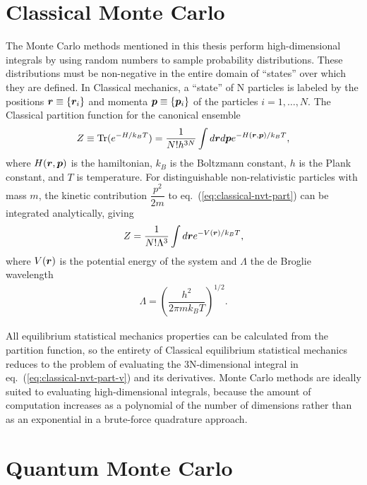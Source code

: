 \section{Classical Monte Carlo}
The Monte Carlo methods mentioned in this thesis perform high-dimensional integrals by using random numbers to sample probability distributions. These distributions must be non-negative in the entire domain of ``states'' over which they are defined. In Classical mechanics, a ``state'' of N particles is labeled by the positions $\boldsymbol{r}\equiv\{\boldsymbol{r}_i\}$ and momenta $\boldsymbol{p}\equiv\{\boldsymbol{p}_i\}$ of the particles $i=1,\dots,N$. The Classical partition function for the canonical ensemble
\begin{align} \label{eq:classical-nvt-part}
Z \equiv \text{Tr}(e^{-H/k_BT}) = \dfrac{1}{N!h^{3N}} \int d\boldsymbol{r} d\boldsymbol{p} e^{-H(\boldsymbol{r}, \boldsymbol{p})/k_BT},
\end{align}
where $H(\boldsymbol{r}, \boldsymbol{p})$ is the hamiltonian, $k_B$ is the Boltzmann constant, $h$ is the Plank constant, and $T$ is temperature. For distinguishable non-relativistic particles with mass $m$, the kinetic contribution $\dfrac{p^2}{2m}$ to eq.~(\ref{eq:classical-nvt-part}) can be integrated analytically, giving
\begin{align}\label{eq:classical-nvt-part-v}
Z = \dfrac{1}{N!\Lambda^{3}} \int d\boldsymbol{r} e^{-V(\boldsymbol{r})/k_BT},
\end{align}
where $V(\boldsymbol{r})$ is the potential energy of the system and $\Lambda$ the de Broglie wavelength
\begin{align}
\Lambda = \left(
\dfrac{h^2}{2\pi mk_BT}
\right)^{1/2}.
\end{align}

All equilibrium statistical mechanics properties can be calculated from the partition function, so the entirety of Classical equilibrium statistical mechanics reduces to the problem of evaluating the 3N-dimensional integral in eq.~(\ref{eq:classical-nvt-part-v}) and its derivatives. Monte Carlo methods are ideally suited to evaluating high-dimensional integrals, because the amount of computation increases as a polynomial of the number of dimensions rather than as an exponential in a brute-force quadrature approach.

\section{Quantum Monte Carlo}

